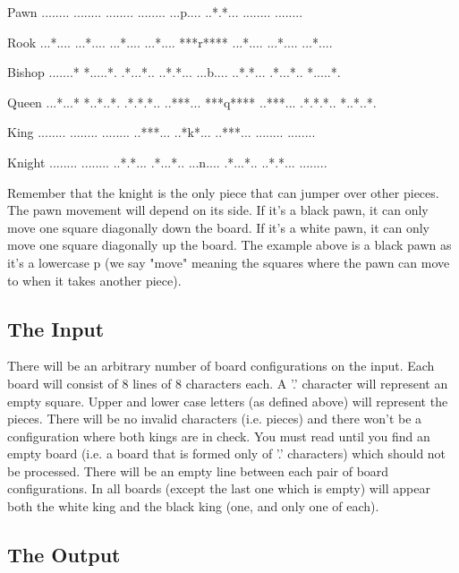 Pawn
........
........
........
........
...p....
..*.*...
........
........



Rook
...*....
...*....
...*....
...*....
***r****
...*....
...*....
...*....



Bishop
.......*
*.....*.
.*...*..
..*.*...
...b....
..*.*...
.*...*..
*.....*.



Queen
...*...*
*..*..*.
.*.*.*..
..***...
***q****
..***...
.*.*.*..
*..*..*.



King
........
........
........
..***...
..*k*...
..***...
........
........



Knight
........
........
..*.*...
.*...*..
...n....
.*...*..
..*.*...
........






Remember that the knight is the only piece that can jumper over other pieces. The pawn movement
will depend on its side. If it's a black pawn, it can only move one square diagonally down the
board. If it's a white pawn, it can only move one square diagonally up the board. The example
above is a black pawn as it's a lowercase p (we say "move" meaning the squares where the pawn
can move to when it takes another piece).


\subsection{The Input}



There will be an arbitrary number of board configurations on the input. Each board will consist
of 8 lines of 8 characters each. A '.' character will represent an empty square. Upper and lower
case letters (as defined above) will represent the pieces. There will be no invalid characters
(i.e. pieces) and there won't be a configuration where both kings are in check. You must read until you find an empty board (i.e. a board that is formed only of '.' characters) which should not be processed. There will be an empty line between each pair of board configurations. In all boards (except the last 
one which is empty) will appear both the white king and the black king (one, and only one of each).


\subsection{The Output}



